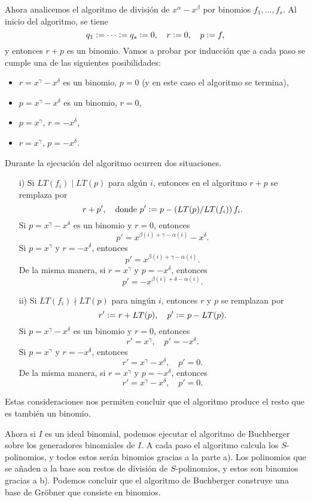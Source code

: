 \documentclass{article}
\theoremstyle{definition}
\begin{document}
\vspace{1em}

Ahora analicemos el algoritmo de división de $x^\alpha - x^\beta$ por binomios
$f_1,\ldots,f_s$. Al inicio del algoritmo, se tiene
$$q_1 \mathrel{\mathop:}= \cdots \mathrel{\mathop:}= q_s \mathrel{\mathop:}= 0, \quad r \mathrel{\mathop:}= 0, \quad p \mathrel{\mathop:}= f,$$
y entonces $r+p$ es un binomio. Vamos a probar por inducción que a cada paso se
cumple una de las siguientes posibilidades:

\begin{itemize}
\item $r = x^\gamma - x^\delta$ es un binomio, $p = 0$ (y en este caso el
  algoritmo se termina),
\item $p = x^\gamma - x^\delta$ es un binomio, $r = 0$,
\item $p = x^\gamma$, $r = -x^\delta$,
\item $r = x^\gamma$, $p = -x^\delta$.
\end{itemize}

Durante la ejecución del algoritmo ocurren dos situaciones.

\begin{enumerate}
\item[i)] Si $LT (f_i) \mid LT (p)$ para algún $i$, entonces en el algoritmo
  $r+p$ se remplaza por
  $$r+p', \quad \text{donde }p' \mathrel{\mathop:}= p - (LT (p)/LT (f_i))\,f_i.$$
  Si $p = x^\gamma - x^\delta$ es un binomio y $r = 0$, entonces
  $$p' = x^{\beta (i) + \gamma - \alpha (i)} - x^\delta.$$
  Si $p = x^\gamma$ y $r = -x^\delta$, entonces
  $$p' = x^{\beta (i) + \gamma - \alpha (i)}.$$
  De la misma manera, si $r = x^\gamma$ y $p = -x^\delta$, entonces
  $$p' = -x^{\beta (i) + \delta - \alpha (i)}.$$

\item[ii)] Si $LT (f_i) \nmid LT (p)$ para ningún $i$, entonces $r$ y $p$ se
  remplazan por
  $$r' \mathrel{\mathop:}= r + LT (p), \quad p' \mathrel{\mathop:}= p - LT (p).$$
  Si $p = x^\gamma - x^\delta$ es un binomio y $r = 0$, entonces
  $$r' = x^\gamma, \quad p' = -x^\delta.$$
  Si $p = x^\gamma$ y $r = -x^\delta$, entonces
  $$r' = x^\gamma - x^\delta, \quad p' = 0.$$
  De la misma manera, si $r = x^\gamma$ y $p = -x^\delta$, entonces
  $$r' = x^\gamma - x^\delta, \quad p' = 0.$$
\end{enumerate}

Estas consideraciones nos permiten concluir que el algoritmo produce el resto
que es también un binomio.

\vspace{1em}

Ahora si $I$ es un ideal binomial, podemos ejecutar el algoritmo de Buchberger
sobre los generadores binomiales de $I$. A cada paso el algoritmo calcula los
$S$-polinomios, y todos estos serán binomios gracias a la parte a). Los
polinomios que se añaden a la base son restos de división de $S$-polinomios,
y estos son binomios gracias a b). Podemos concluir que el algoritmo de
Buchberger construye una base de Gröbner que consiste en binomios.
\end{document}
